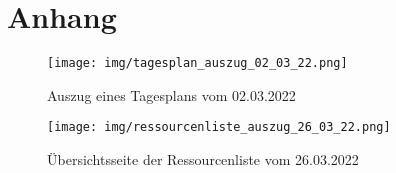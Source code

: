 \section{Anhang}







\begin{figure}[H]
    \texttt{[image: img/tagesplan\_auszug\_02\_03\_22.png]}
    \caption{Auszug eines Tagesplans vom 02.03.2022}\label{fig:tagesplan}
\end{figure}

\begin{figure}[H]
    \texttt{[image: img/ressourcenliste\_auszug\_26\_03\_22.png]}
    \caption{Übersichtsseite der Ressourcenliste vom 26.03.2022}\label{fig:ressourcenliste}
\end{figure}
